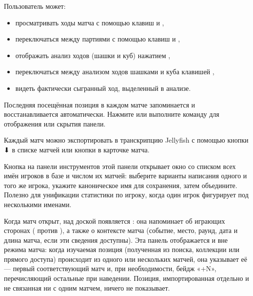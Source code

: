 \documentclass[letterpaper,10pt,russian]{sphinxmanual}
\begin{document}
\sphinxAtStartPar
Пользователь может:
\begin{itemize}
\item {} 
\sphinxAtStartPar
просматривать ходы матча с помощью клавиш  и ,

\item {} 
\sphinxAtStartPar
переключаться между партиями с помощью клавиш  и ,

\item {} 
\sphinxAtStartPar
отображать анализ ходов (шашки и куб) нажатием ,

\item {} 
\sphinxAtStartPar
переключаться между анализом ходов шашками и куба клавишей ,

\item {} 
\sphinxAtStartPar
видеть фактически сыгранный ход, выделенный в анализе.

\end{itemize}

\sphinxAtStartPar
Последняя посещённая позиция в каждом матче запоминается и восстанавливается автоматически. Нажмите  или выполните команду  для отображения или скрытия панели.

\sphinxAtStartPar
Каждый матч можно экспортировать в транскрипцию Jellyfish  с помощью кнопки ⬇ в списке матчей или кнопки  в карточке матча.

\sphinxAtStartPar
Кнопка  на панели инструментов этой панели открывает окно со списком всех имён игроков в базе и числом их матчей: выберите варианты написания одного и того же игрока, укажите каноническое имя для сохранения, затем объедините. Полезно для унификации статистики по игроку, когда один игрок фигурирует под несколькими именами.

\sphinxAtStartPar
Когда матч открыт, над доской появляется : она напоминает об играющих сторонах ( против ), а также о контексте матча (событие, место, раунд, дата и длина матча, если эти сведения доступны). Эта панель отображается и вне режима матча: когда изучаемая позиция (полученная из поиска, коллекции или прямого доступа) происходит из одного или нескольких матчей, она указывает её  — первый соответствующий матч и, при необходимости, бейдж «+N», перечисляющий остальные при наведении. Позиция, импортированная отдельно и не связанная ни с одним матчем, ничего не показывает.
\end{document}
